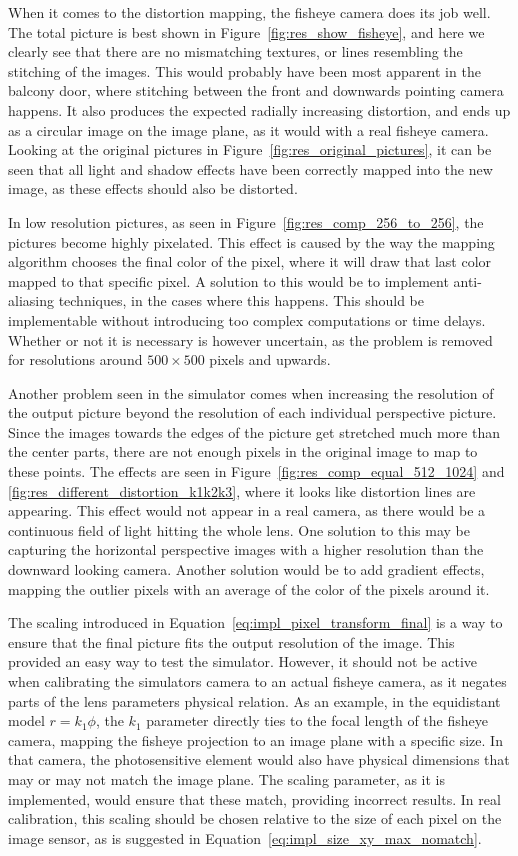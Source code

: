 When it comes to the distortion mapping, the fisheye camera does its job well. The total picture is best shown in Figure~\ref{fig:res_show_fisheye}, and here we clearly see that there are no mismatching textures, or lines resembling the stitching of the images. This would probably have been most apparent in the balcony door, where stitching between the front and downwards pointing camera happens. It also produces the expected radially increasing distortion, and ends up as a circular image on the image plane, as it would with a real fisheye camera. Looking at the original pictures in Figure~\ref{fig:res_original_pictures}, it can be seen that all light and shadow effects have been correctly mapped into the new image, as these effects should also be distorted. 

In low resolution pictures, as seen in Figure~\ref{fig:res_comp_256_to_256}, the pictures become highly pixelated. This effect is caused by the way the mapping algorithm chooses the final color of the pixel, where it will draw that last color mapped to that specific pixel. A solution to this would be to implement anti-aliasing techniques, in the cases where this happens. This should be implementable without introducing too complex computations or time delays. Whether or not it is necessary is however uncertain, as the problem is removed for resolutions around $500\times 500$ pixels and upwards.

Another problem seen in the simulator comes when increasing the resolution of the output picture beyond the resolution of each individual perspective picture. Since the images towards the edges of the picture get stretched much more than the center parts, there are not enough pixels in the original image to map to these points. The effects are seen in Figure~\ref{fig:res_comp_equal_512_1024} and \ref{fig:res_different_distortion_k1k2k3}, where it looks like distortion lines are appearing. This effect would not appear in a real camera, as there would be a continuous field of light hitting the whole lens. One solution to this may be capturing the horizontal perspective images with a higher resolution than the downward looking camera. Another solution would be to add gradient effects, mapping the outlier pixels with an average of the color of the pixels around it. 

The scaling introduced in Equation~\eqref{eq:impl_pixel_transform_final} is a way to ensure that the final picture fits the output resolution of the image. This provided an easy way to test the simulator. However, it should not be active when calibrating the simulators camera to an actual fisheye camera, as it negates parts of the lens parameters physical relation. As an example, in the equidistant model $r=k_1 \phi$, the $k_1$ parameter directly ties to the focal length of the fisheye camera, mapping the fisheye projection to an image plane with a specific size. In that camera, the photosensitive element would also have physical dimensions that may or may not match the image plane. The scaling parameter, as it is implemented, would ensure that these match, providing incorrect results. In real calibration, this scaling should be chosen relative to the size of each pixel on the image sensor, as is suggested in Equation~\eqref{eq:impl_size_xy_max_nomatch}.

